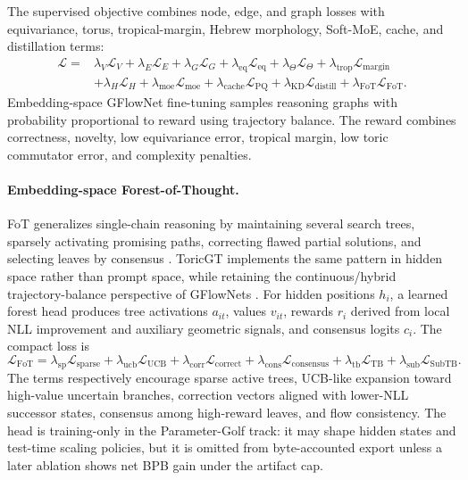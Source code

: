 \documentclass[10pt]{article}
\theoremstyle{definition}
\theoremstyle{plain}
\theoremstyle{remark}
\begin{document}
The supervised objective combines node, edge, and graph losses with equivariance, torus, tropical-margin, Hebrew morphology, Soft-MoE, cache, and distillation terms:
\begin{equation}
\begin{split}
\mathcal L={}&\lambda_V\mathcal L_V+\lambda_E\mathcal L_E+\lambda_G\mathcal L_G
+\lambda_{\mathrm{eq}}\mathcal L_{\mathrm{eq}}
+\lambda_\Theta\mathcal L_\Theta+\lambda_{\mathrm{trop}}\mathcal L_{\mathrm{margin}}\\
&+\lambda_H\mathcal L_H+\lambda_{\mathrm{moe}}\mathcal L_{\mathrm{moe}}
+\lambda_{\mathrm{cache}}\mathcal L_{\mathrm{PQ}}
+\lambda_{\mathrm{KD}}\mathcal L_{\mathrm{distill}}
+\lambda_{\mathrm{FoT}}\mathcal L_{\mathrm{FoT}}.
\end{split}
\end{equation}
Embedding-space GFlowNet fine-tuning samples reasoning graphs with probability proportional to reward using trajectory balance.  The reward combines correctness, novelty, low equivariance error, tropical margin, low toric commutator error, and complexity penalties.

\paragraph{Embedding-space Forest-of-Thought.}
FoT generalizes single-chain reasoning by maintaining several search trees, sparsely activating promising paths, correcting flawed partial solutions, and selecting leaves by consensus \cite{bi2024forest}.  ToricGT implements the same pattern in hidden space rather than prompt space, while retaining the continuous/hybrid trajectory-balance perspective of GFlowNets \cite{lahlou2023continuous}.  For hidden positions $h_i$, a learned forest head produces tree activations $a_{it}$, values $v_{it}$, rewards $r_i$ derived from local NLL improvement and auxiliary geometric signals, and consensus logits $c_i$.  The compact loss is
\begin{equation}
  \mathcal L_{\mathrm{FoT}}
  =
  \lambda_{\mathrm{sp}}\mathcal L_{\mathrm{sparse}}
  +\lambda_{\mathrm{ucb}}\mathcal L_{\mathrm{UCB}}
  +\lambda_{\mathrm{corr}}\mathcal L_{\mathrm{correct}}
  +\lambda_{\mathrm{cons}}\mathcal L_{\mathrm{consensus}}
  +\lambda_{\mathrm{tb}}\mathcal L_{\mathrm{TB}}
  +\lambda_{\mathrm{sub}}\mathcal L_{\mathrm{SubTB}} .
\end{equation}
The terms respectively encourage sparse active trees, UCB-like expansion toward high-value uncertain branches, correction vectors aligned with lower-NLL successor states, consensus among high-reward leaves, and flow consistency.  The head is training-only in the Parameter-Golf track: it may shape hidden states and test-time scaling policies, but it is omitted from byte-accounted export unless a later ablation shows net BPB gain under the artifact cap.
\end{document}
